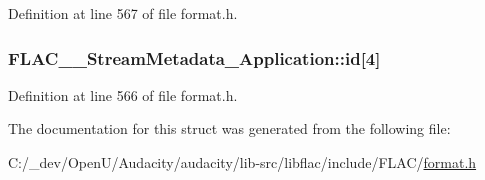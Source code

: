 Definition at line 567 of file format.\+h.

\subsubsection[{\texorpdfstring{id}{id}}]{ F\+L\+A\+C\+\_\+\+\_\+\+Stream\+Metadata\+\_\+\+Application\+::id\mbox{[}4\mbox{]}}\hypertarget{struct_f_l_a_c_____stream_metadata___application_a0af01573d097b37b48b4a414318ec2ec}{}\label{struct_f_l_a_c_____stream_metadata___application_a0af01573d097b37b48b4a414318ec2ec}


Definition at line 566 of file format.\+h.



The documentation for this struct was generated from the following file\+:\begin{DoxyCompactItemize}
\item 
C\+:/\+\_\+dev/\+Open\+U/\+Audacity/audacity/lib-\/src/libflac/include/\+F\+L\+A\+C/\hyperlink{include_2_f_l_a_c_2format_8h}{format.\+h}\end{DoxyCompactItemize}
